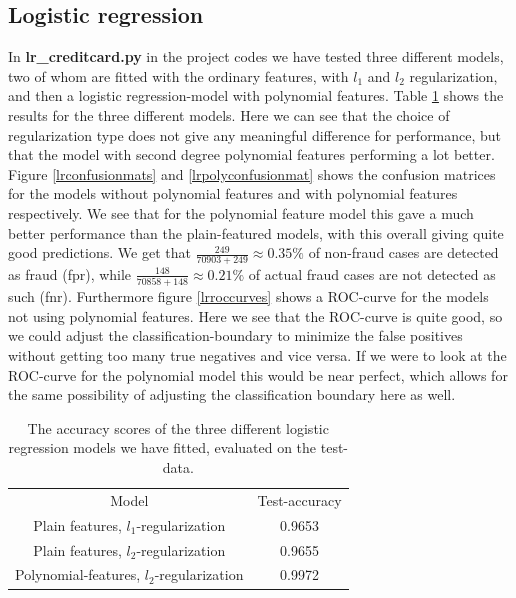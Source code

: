 \documentclass{article}
\begin{document}
\subsection{Logistic regression}
In \textbf{lr\_creditcard.py} in the project codes \cite{githubrepoproject3} we
have tested three different models, two of whom are fitted with the ordinary
features, with $l_1$ and $l_2$ regularization, and then a logistic
regression-model with polynomial features. Table \ref{lrresults} shows the
results for the three different models. Here we can see that the choice of
regularization type does not give any meaningful difference for performance,
but that the model with second degree polynomial features performing a lot
better. Figure \ref{lrconfusionmats} and \ref{lrpolyconfusionmat} shows
the confusion matrices for the models without polynomial features and with
polynomial features respectively. We see that for the polynomial feature model
this gave a much better performance than the plain-featured models, with this
overall giving quite good predictions. We get that $\frac{249}{70903+249}
	\approx 0.35\%$ of non-fraud cases are detected as fraud (fpr), while
$\frac{148}{70858 + 148} \approx 0.21\%$ of actual fraud cases are not detected
as such (fnr). Furthermore figure \ref{lrroccurves} shows a ROC-curve for the models
not using polynomial features. Here we see that the ROC-curve is quite good, so
we could adjust the classification-boundary to minimize the false positives
without getting too many true negatives and vice versa. If we were to look at
the ROC-curve for the polynomial model this would be near perfect, which allows
for the same possibility of adjusting the classification boundary here as well.


\begin{table}
	\centering
	\begin{tabular}{| c | c |}
		Model                                     & Test-accuracy \\
		Plain features, $l_1$-regularization      & 0.9653        \\
		Plain features, $l_2$-regularization      & 0.9655        \\
		Polynomial-features, $l_2$-regularization & 0.9972
	\end{tabular}
	\caption{The accuracy scores of the three different logistic regression
		models we have fitted, evaluated on the test-data.}
	\label{lrresults}
\end{table}
\end{document}
